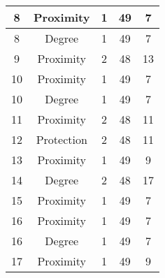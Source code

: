 \documentclass[results.tex]{subfiles}
\begin{document}
\begin{center}
\begin{tabular}{| c || c | c | c | c |}
            \hline
            8                       & Proximity                    & 1                      & 49                      & 7                    \\
            \hline
            8                       & Degree                       & 1                      & 49                      & 7                    \\
            \hline
            9                       & Proximity                    & 2                      & 48                      & 13                   \\
            \hline
            10                      & Proximity                    & 1                      & 49                      & 7                    \\
            \hline
            10                      & Degree                       & 1                      & 49                      & 7                    \\
            \hline
            11                      & Proximity                    & 2                      & 48                      & 11                   \\
            \hline
            12                      & Protection                   & 2                      & 48                      & 11                   \\
            \hline
            13                      & Proximity                    & 1                      & 49                      & 9                    \\
            \hline
            14                      & Degree                       & 2                      & 48                      & 17                   \\
            \hline
            15                      & Proximity                    & 1                      & 49                      & 7                    \\
            \hline
            16                      & Proximity                    & 1                      & 49                      & 7                    \\
            \hline
            16                      & Degree                       & 1                      & 49                      & 7                    \\
            \hline
            17                      & Proximity                    & 1                      & 49                      & 9                    \\

\end{tabular}
\end{center}
\end{document}

